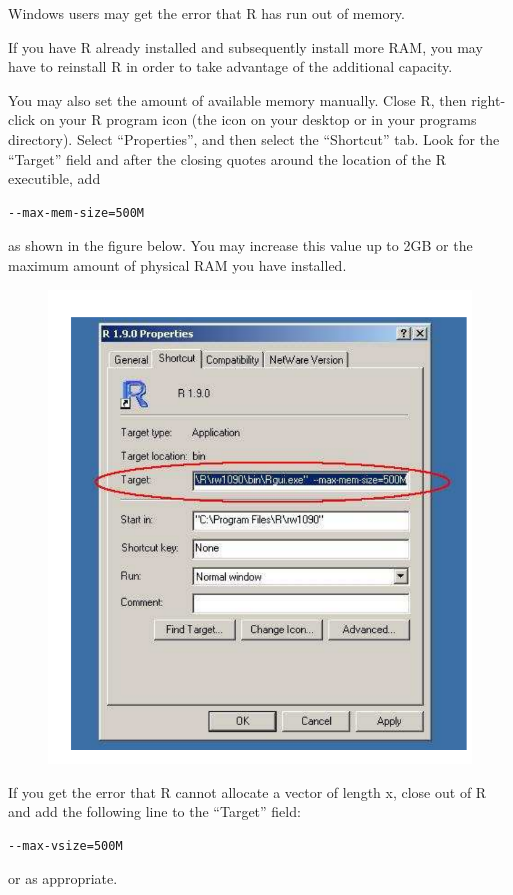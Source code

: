 Windows users may get the error that R has run out of memory.  

If you have R already installed and subsequently install more RAM, you
may have to reinstall R in order to take advantage of the additional
capacity.

You may also set the amount of available memory manually.  Close R,
then right-click on your R program icon (the icon on your desktop or
in your programs directory). Select ``Properties'', and then select
the ``Shortcut'' tab.  Look for the ``Target'' field and after the
closing quotes around the location of the R executible, add
\begin{verbatim}
--max-mem-size=500M
\end{verbatim}
as shown in the figure below.  You may increase this value up to 2GB
or the maximum amount of physical RAM you have installed.

\begin{figure}[h!]
\begin{center}
\includegraphics{figs/increase}
\end{center}
\end{figure}

If you get the error that R cannot allocate a vector of length x,
close out of R and add the following line to the ``Target'' field:  
\begin{verbatim}
--max-vsize=500M
\end{verbatim}
or as appropriate.  

